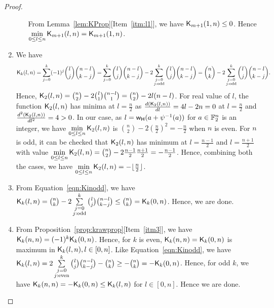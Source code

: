 \documentclass{llncs}
\begin{document}
\begin{proof}
\begin{enumerate}
\begin{enumerate}
From Lemma~\ref{lem:KProp}[Item~\ref{itm:l1}], we have $\mathsf{K}_{m+1}(1,n) \leq 0$. Hence $\min\limits_{0 \leq l \leq n }\mathsf{K}_{m + 1}(l,n) = \mathsf{K}_{m + 1}(1,n)$.
\end{enumerate}
\item We have
{\small
\begin{equation}\label{eqn:Kinodd}
\mathsf{K}_{k}(l,n) = \sum\limits_{j=0}^k(-1)^j{l \choose j}{n-l \choose k-j}
= \sum\limits_{j=0}^k {l \choose j}{n-l \choose k-j} - 2 \sum\limits_{\substack{j=0 \\ j: \text{odd}}}^k {l \choose j}{n-l \choose k-j}
= {n \choose k} - 2 \sum\limits_{\substack{j=0 \\ j: \text{odd}}}^k {l \choose j}{n-l \choose k-j}.
\end{equation}}
Hence, $\mathsf{K}_{2}(l,n) = {n \choose 2} - 2{l \choose 1}{n-l \choose 1} = {n \choose 2} - 2l(n-l)$. For real value of $l$, the function $\mathsf{K}_{2}(l,n)$ has minima at $l = \frac{n}{2}$ as $\frac{d(\mathsf{K}_{2}(l,n))}{dl} = 4l-2n = 0$ at $l = \frac{n}{2}$ and $\frac{d^2(\mathsf{K}_{2}(l,n))}{dl^2} = 4 > 0$. In our case, as $l = \mathsf{w_H}(a+\psi^{-1}(a))$ for $a \in \mathbb{F}_2^n$ is an integer, we have $\min\limits_{0 \leq l \leq n} \mathsf{K}_{2}(l,n)$ is ${n \choose 2} - 2(\frac{n}{2})^2 = -\frac{n}{2}$ when $n$ is even. For $n$ is odd, it can be checked that $\mathsf{K}_{2}(l,n)$ has minimum at $l = \frac{n-1}{2}$ and $l = \frac{n+1}{2}$ with value $\min\limits_{0 \leq l \leq n} \mathsf{K}_{2}(l,n) =
{n \choose 2} - 2\frac{n-1}{2} \frac{n+1}{2}= -\frac{n-1}{2}$. Hence, combining both the cases, we have $\min\limits_{0 \leq l \leq n} \mathsf{K}_{2}(l,n) = -\lfloor \frac{n}{2} \rfloor$.
\item From Equation~\ref{eqn:Kinodd}, we have 
$\mathsf{K}_{k}(l,n) = {n \choose k} - 2 \sum\limits_{\substack{j=0 \\ j: \text{odd}}}^k {l \choose j}{n-l \choose k-j} \leq {n \choose k} = \mathsf{K}_{k}(0,n)$. Hence,  we are done.
\item From Proposition~\ref{prop:krawprop}[Item~\ref{itm3}], we have $\mathsf{K}_{k}(n,n) = (-1)^k \mathsf{K}_{k}(0,n)$. Hence, for $k$ is even, $\mathsf{K}_{k}(n,n) = \mathsf{K}_{k}(0,n)$ is maximum in $\mathsf{K}_{k}(l,n), l\in [0,n]$.
Like Equation~\ref{eqn:Kinodd}, we have $\mathsf{K}_{k}(l,n) = 2 \sum\limits_{\substack{j=0 \\ j: \text{even}}}^k {l \choose j}{n-l \choose k-j} - {n \choose k} \geq - {n \choose k} = -\mathsf{K}_{k}(0,n)$.
Hence, for odd $k$, we have $\mathsf{K}_{k}(n,n) = -\mathsf{K}_{k}(0,n) \leq \mathsf{K}_{k}(l,n)$ for $l \in [0,n]$. Hence we are done.
\end{enumerate}
\end{proof}
\end{document}
